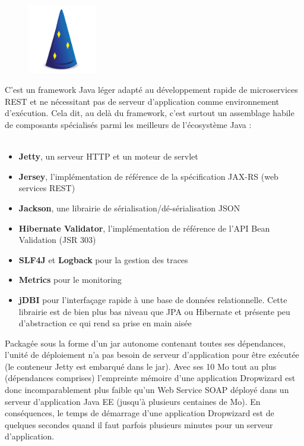 \begin{itemize}
\begin{figure}
\centering
\includegraphics[width=3cm]{images/dropwizard.png}
\end{figure}
\noindent C'est un framework Java léger adapté au développement rapide de microservices REST et ne nécessitant pas de serveur d'application comme environnement d'exécution.
Cela dit, au delà du framework, c'est surtout un assemblage habile de composants spécialisés parmi les meilleurs de l'écosystème Java :
~~\\
~~\\
\begin{itemize}
\item \textbf{Jetty}, un serveur HTTP et un moteur de servlet
\item \textbf{Jersey}, l'implémentation de référence de la spécification JAX-RS (web services REST) 
\item \textbf{Jackson}, une librairie de sérialisation/dé-sérialisation JSON 
\item \textbf{Hibernate Validator}, l'implémentation de référence de l'API Bean Validation (JSR 303) 
\item \textbf{SLF4J} et \textbf{Logback} pour la gestion des traces 
\item \textbf{Metrics} pour le monitoring 
\item \textbf{jDBI} pour l'interfaçage rapide à une base de données relationnelle. Cette librairie est de bien plus bas niveau que JPA ou Hibernate et présente peu d'abstraction ce qui rend sa prise en main aisée \\
\end{itemize}

Packagée sous la forme d'un jar autonome contenant toutes ses dépendances, l'unité de déploiement n'a pas besoin de serveur d'application pour être exécutée (le conteneur Jetty est embarqué dans le jar). Avec ses 10 Mo tout au plus (dépendances comprises) l'empreinte mémoire d'une application Dropwizard est donc incomparablement plus faible qu'un Web Service SOAP déployé dans un serveur d'application Java EE (jusqu'à plusieurs centaines de Mo).
En conséquences, le temps de démarrage d'une application Dropwizard est de quelques secondes quand il faut parfois plusieurs minutes pour un serveur d'application.\\


\end{itemize}
